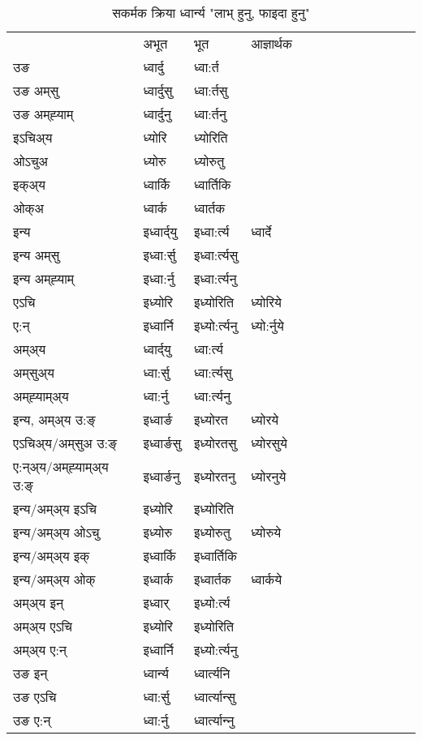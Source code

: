 \begin{table}[H]
\centering
\caption{\label{ort.vt} सकर्मक क्रिया  ध्वार्न्य  "लाभ् हुनु, फाइदा हुनु"  }
\begin{tabular}{l|l|l|l|l|l|l|l|l|l|l|l|l}  \toprule
&अभूत & भूत & आज्ञार्थक \\ 
उङ &ध्वार्दु &ध्वा:र्त \\ 
उङ अम्‌सु&ध्वार्दुसु &ध्वा:र्तसु \\ 
उङ अम्‌ह्‍याम्&ध्वार्दुनु &ध्वा:र्तनु \\ 
इऽचिअ्य &ध्योरि &ध्योरिति   \\ 
ओऽचुअ        &ध्योरु &ध्योरुतु   \\ 
इक्अ्य&ध्वार्कि &ध्वार्तिकि   \\ 
ओक्अ &ध्वार्क &ध्वार्तक   \\ 
इन्य & इध्वार्द्‌यु  & इध्वा:र्त्य &ध्वार्दे  \\ 
इन्य अम्‌सु& इध्वा:र्सु  & इध्वा:र्त्यसु   \\ 
इन्य अम्‌ह्‍याम्& इध्वा:र्नु  & इध्वा:र्त्यनु   \\ 
एऽचि & इध्योरि & इध्योरिति &ध्योरिये    \\ 
ए:न् & इध्वार्नि  & इध्यो:र्त्यनु &ध्यो:र्नुये  \\ 
अम्अ्य & ध्वार्द्‌यु  & ध्वा:र्त्य  \\ 
अम्‌सुअ्य & ध्वा:र्सु & ध्वा:र्त्यसु  \\ 
अम्‌ह्‍याम्अ्य & ध्वा:र्नु  & ध्वा:र्त्यनु \\ 
\midrule
इन्य, अम्अ्य उ:ङ्‌ &इध्वार्ङ &इध्योरत &ध्योरये \\ 
एऽचिअ्य/अम्‌सुअ उ:ङ्‌ &इध्वार्ङसु &इध्योरतसु &ध्योरसुये \\ 
ए:न्अ्य/अम्‌ह्‍याम्अ्य उ:ङ्‌ &इध्वार्ङनु &इध्योरतनु &ध्योरनुये \\ 
इन्य/अम्अ्य इऽचि &इध्योरि &इध्योरिति    \\ 
इन्य/अम्अ्य ओऽचु &इध्योरु &इध्योरुतु  &ध्योरुये  \\ 
इन्य/अम्अ्य इक् &इध्वार्कि &इध्वार्तिकि   \\ 
इन्य/अम्अ्य ओक् &इध्वार्क &इध्वार्तक  &ध्वार्कये  \\ 
अम्अ्य इन् & इध्वार् & इध्यो:र्त्य   \\ 
अम्अ्य एऽचि & इध्योरि & इध्योरिति    \\ 
अम्अ्य ए:न् & इध्वार्नि  & इध्यो:र्त्यनु  \\ 
\midrule
उङ इन् & ध्वार्न्य  & ध्वार्त्यनि  \\ 
उङ एऽचि & ध्वा:र्सु  & ध्वार्त्यान्सु   \\ 
उङ ए:न्& ध्वा:र्नु  & ध्वार्त्यान्‍नु   \\ 
\bottomrule
\end{tabular}
\end{table}


